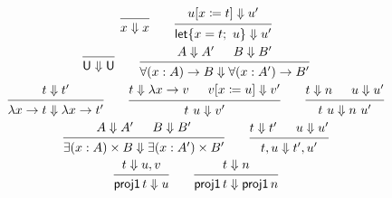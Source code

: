 \begin{figure}
  \begin{gather*}
    \begin{prooftree}
      \infer0{x \Downarrow x}
    \end{prooftree}
    \qquad
    \begin{prooftree}
      \hypo{u[x \coleqq t] \Downarrow u'}
      \infer1{\Let \{ x = t;\ u \} \Downarrow u'}
    \end{prooftree}
    \\
    \begin{prooftree}
      \infer0{\Univ \Downarrow \Univ}
    \end{prooftree}
    \qquad
    \begin{prooftree}
      \hypo{A \Downarrow A'}
      \hypo{B \Downarrow B'}
      \infer2{\forall (x : A) \to B \Downarrow \forall (x : A') \to B'}
    \end{prooftree}
    \\
    \begin{prooftree}
      \hypo{t \Downarrow t'}
      \infer1{\lambda x \to t \Downarrow \lambda x \to t'}
    \end{prooftree}
    \qquad
    \begin{prooftree}
      \hypo{t \Downarrow \lambda x \to v}
      \hypo{v[x \coleqq u] \Downarrow v'}
      \infer2{t\ u \Downarrow v'}
    \end{prooftree}
    \qquad
    \begin{prooftree}
      \hypo{t \Downarrow n}
      \hypo{u \Downarrow u'}
      \infer2{t\ u \Downarrow n\ u'}
    \end{prooftree}
    \\
    \begin{prooftree}
      \hypo{A \Downarrow A'}
      \hypo{B \Downarrow B'}
      \infer2{\exists (x : A) \times B \Downarrow \exists (x : A') \times B'}
    \end{prooftree}
    \qquad
    \begin{prooftree}
      \hypo{t \Downarrow t'}
      \hypo{u \Downarrow u'}
      \infer2{t, u \Downarrow t', u'}
    \end{prooftree}
    \\
    \begin{prooftree}
      \hypo{t \Downarrow u, v}
      \infer1{\ProjOne t \Downarrow u}
    \end{prooftree}
    \qquad
    \begin{prooftree}
      \hypo{t \Downarrow n}
      \infer1{\ProjOne t \Downarrow \ProjOne n}

\end{prooftree}
\end{gather*}
\end{figure}
